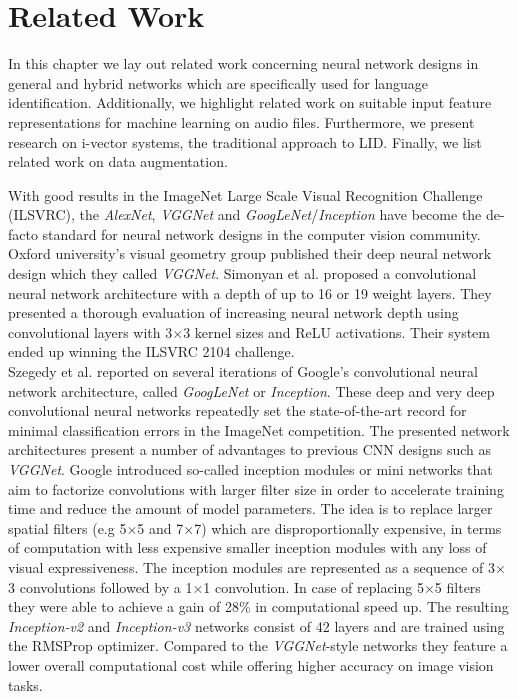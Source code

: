 \section{Related Work}
\label{sec:related_work}
In this chapter we lay out related work concerning neural network designs in general and hybrid networks which are specifically used for language identification. Additionally, we highlight related work on suitable input feature representations for machine learning on audio files. Furthermore, we present research on i-vector systems, the traditional approach to LID. Finally, we list related work on data augmentation. 

With good results in the ImageNet Large Scale Visual Recognition Challenge (ILSVRC)\cite{ILSVRC15}, the \emph{AlexNet}\cite{krizhevsky2012imagenet}, \emph{VGGNet}\cite{simonyan2014very} and \emph{GoogLeNet}/\emph{Inception}\cite{szegedy2015going} have become the de-facto standard for neural network designs in the computer vision community.\\ 
Oxford university's visual geometry group published their deep neural network design which they called \emph{VGGNet}. Simonyan et al. proposed a convolutional neural network architecture with a depth of up to 16 or 19 weight layers.\cite{simonyan2014very, Chatfield14} They presented a thorough evaluation of increasing neural network depth using convolutional layers with 3$\times$3 kernel sizes and ReLU activations. Their system ended up winning the ILSVRC 2104 challenge.\\
Szegedy et al. reported on several iterations of Google's convolutional neural network architecture, called \emph{GoogLeNet} or \emph{Inception}.\cite{szegedy2015going, szegedy2016rethinking, szegedy2016inception} These deep and very deep convolutional neural networks repeatedly set the state-of-the-art record for minimal classification errors in the ImageNet competition. The presented network architectures present a number of advantages to previous CNN designs such as \emph{VGGNet}. Google introduced so-called inception modules or mini networks that aim to factorize convolutions with larger filter size in order to accelerate training time and reduce the amount of model parameters. The idea is to replace larger spatial filters (e.g 5$\times$5 and 7$\times$7) which are disproportionally expensive, in terms of computation with less expensive smaller inception modules with any loss of visual expressiveness. The inception modules are represented as a sequence of 3$\times$3 convolutions followed by a 1$\times$1 convolution. In case of replacing 5$\times$5 filters they were able to achieve a gain of 28\% in computational speed up. The resulting \emph{Inception-v2} and \emph{Inception-v3} networks consist of 42 layers and are trained using the RMSProp\cite{tieleman2012lecture} optimizer. Compared to the \emph{VGGNet}-style networks they feature a lower overall computational cost while offering higher accuracy on image vision tasks.

